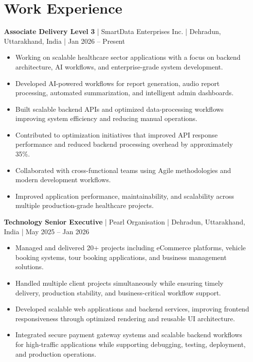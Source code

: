 \documentclass[10pt,a4paper]{article}
\begin{document}
\section*{Work Experience}
\textbf{Associate Delivery Level 3} | SmartData Enterprises Inc. | Dehradun, Uttarakhand, India | Jan 2026 -- Present
\begin{itemize}
  \item Working on scalable healthcare sector applications with a focus on backend architecture, AI workflows, and enterprise-grade system development.
  \item Developed AI-powered workflows for report generation, audio report processing, automated summarization, and intelligent admin dashboards.
  \item Built scalable backend APIs and optimized data-processing workflows improving system efficiency and reducing manual operations.
  \item Contributed to optimization initiatives that improved API response performance and reduced backend processing overhead by approximately 35\%.
  \item Collaborated with cross-functional teams using Agile methodologies and modern development workflows.
  \item Improved application performance, maintainability, and scalability across multiple production-grade healthcare projects.
\end{itemize}

\textbf{Technology Senior Executive} | Pearl Organisation | Dehradun, Uttarakhand, India | May 2025 -- Jan 2026
\begin{itemize}
  \item Managed and delivered 20+ projects including eCommerce platforms, vehicle booking systems, tour booking applications, and business management solutions.
  \item Handled multiple client projects simultaneously while ensuring timely delivery, production stability, and business-critical workflow support.
  \item Developed scalable web applications and backend services, improving frontend responsiveness through optimized rendering and reusable UI architecture.
  \item Integrated secure payment gateway systems and scalable backend workflows for high-traffic applications while supporting debugging, testing, deployment, and production operations.
\end{itemize}
\end{document}
